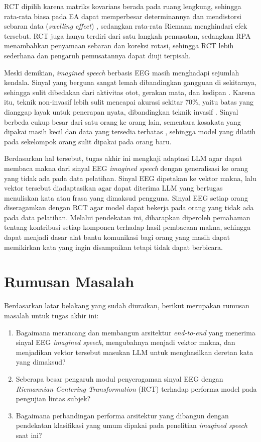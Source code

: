 RCT dipilih karena matriks kovarians berada pada ruang lengkung, sehingga rata-rata biasa pada EA dapat memperbesar determinannya dan mendistorsi sebaran data (\textit{swelling effect}) \parencite{arsigny2005}, sedangkan rata-rata Riemann menghindari efek tersebut.
RCT juga hanya terdiri dari satu langkah pemusatan, sedangkan RPA menambahkan penyamaan sebaran dan koreksi rotasi, sehingga RCT lebih sederhana dan pengaruh pemusatannya dapat diuji terpisah.

Meski demikian, \textit{imagined speech} berbasis EEG masih menghadapi sejumlah kendala.
Sinyal yang berguna sangat lemah dibandingkan gangguan di sekitarnya, sehingga sulit dibedakan dari aktivitas otot, gerakan mata, dan kedipan \parencite{lopezbernal2022}.
Karena itu, teknik non-invasif lebih sulit mencapai akurasi sekitar 70\%, yaitu batas yang dianggap layak untuk penerapan nyata, dibandingkan teknik invasif \parencite{lopezbernal2022}.
Sinyal berbeda cukup besar dari satu orang ke orang lain, sementara kosakata yang dipakai masih kecil dan data yang tersedia terbatas \parencite{duhair2026}, sehingga model yang dilatih pada sekelompok orang sulit dipakai pada orang baru.

Berdasarkan hal tersebut, tugas akhir ini mengkaji adaptasi LLM agar dapat membaca makna dari sinyal EEG \textit{imagined speech} dengan generalisasi ke orang yang tidak ada pada data pelatihan.
Sinyal EEG dipetakan ke vektor makna, lalu vektor tersebut diadaptasikan agar dapat diterima LLM yang bertugas menuliskan kata atau frasa yang dimaksud pengguna.
Sinyal EEG setiap orang diseragamkan dengan RCT agar model dapat bekerja pada orang yang tidak ada pada data pelatihan.
Melalui pendekatan ini, diharapkan diperoleh pemahaman tentang kontribusi setiap komponen terhadap hasil pembacaan makna, sehingga dapat menjadi dasar alat bantu komunikasi bagi orang yang masih dapat memikirkan kata yang ingin disampaikan tetapi tidak dapat berbicara.

\section{Rumusan Masalah}
\label{sec:rumusan-masalah}
Berdasarkan latar belakang yang sudah diuraikan, berikut merupakan rumusan masalah untuk tugas akhir ini:
\begin{enumerate}
    \item Bagaimana merancang dan membangun arsitektur \textit{end-to-end} yang menerima sinyal EEG \textit{imagined speech}, mengubahnya menjadi vektor makna, dan menjadikan vektor tersebut masukan LLM untuk menghasilkan deretan kata yang dimaksud?
    \item Seberapa besar pengaruh modul penyeragaman sinyal EEG dengan \textit{Riemannian Centering Transformation} (RCT) terhadap performa model pada pengujian lintas subjek?
    \item Bagaimana perbandingan performa arsitektur yang dibangun dengan pendekatan klasifikasi yang umum dipakai pada penelitian \textit{imagined speech} saat ini?
\end{enumerate}

